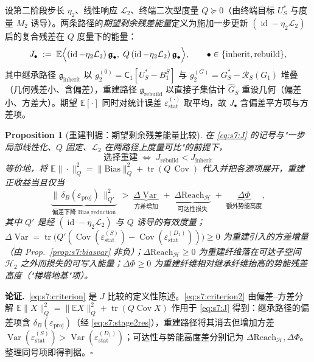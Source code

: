 \documentclass[11pt,a4paper]{article}
\newtheorem{proposition}[theorem]{Proposition}
\DeclareMathOperator{\Cov}{Cov}
\DeclareMathOperator{\Var}{Var}
\DeclareMathOperator{\tr}{tr}
\DeclareMathOperator{\id}{id}
\newcommand{\E}{\mathbb{E}}
\newcommand{\cH}{\mathcal{H}}   %
\newcommand{\cL}{\mathcal{L}}   %
\newcommand{\Rstr}{\mathcal{R}}     %
\newcommand{\Center}{\mathsf{C}}    %
\newcommand{\gres}{\bm{\mathfrak{g}}} %
\begin{document}
设第二阶段步长 $\eta_2$、线性响应 $\cL_2$、终端二次型度量 $Q\succeq 0$（由终端目标 $U_S^*$ 与度量 $M_2$ 诱导）。两条路径的\emph{期望剩余残差能量}定义为施加一步更新 $(\id-\eta_2\cL_2)$ 后的复合残差在 $Q$ 度量下的能量：
\begin{equation}\label{eq:s7:J}
J_\bullet \;:=\; \E\Bigl\langle (\id-\eta_2\cL_2)\,\gres_\bullet,\; Q\,(\id-\eta_2\cL_2)\,\gres_\bullet\Bigr\rangle,\qquad \bullet\in\{\text{inherit},\text{rebuild}\},
\end{equation}
其中继承路径 $\gres_{\text{inherit}}$ 以 $g_2^{(0)}=\Center_1[U_S^*-B_1^S]$ 与 $g_2^{(G)}=G_S^*-\Rstr_S(G_1)$ 堆叠（几何残差小、含偏差），重建路径 $\gres_{\text{rebuild}}$ 以直接子集估计 $\widehat{G}_S$ 重设几何（偏差小、方差大）。期望 $\E[\cdot]$ 同时对统计误差 $\varepsilon_{\mathrm{stat}}^{(\cdot)}$ 取平均，故 $J_\bullet$ 含偏差平方项与方差项。

\begin{proposition}[重建判据：期望剩余残差能量比较]\label{prop:s7:rebuild}
在 \eqref{eq:s7:J} 的记号与"一步局部线性化、$Q$ 固定、$\cL_2$ 在两路径上度量可比"的前提下，
\begin{equation}\label{eq:s7:criterion}
\boxed{\;\text{选择重建}\;\iff\; J_{\text{rebuild}} < J_{\text{inherit}}\;}
\end{equation}
等价地，将 $\E\|\cdot\|_Q^2 = \|\text{Bias}\|_Q^2+\tr(Q\,\Cov)$ 代入并把各源项展开，重建正收益当且仅当
\begin{equation}\label{eq:s7:criterion2}
\underbrace{\bigl\|\,\delta_B(\varepsilon_{\mathrm{proj}})\,\bigr\|_{Q'}^2}_{\textstyle \text{偏差下降 Bias\_reduction}}
\;>\;
\underbrace{\Delta\!\Var}_{\textstyle \text{方差增加}}
\;+\;
\underbrace{\Delta\mathrm{Reach}_{\cH}}_{\textstyle \text{可达性损失}}
\;+\;
\underbrace{\Delta\!\Phi}_{\textstyle \text{额外势能高度}},
\end{equation}
其中 $Q'$ 是经 $(\id-\eta_2\cL_2)$ 与 $Q$ 诱导的有效度量；$\Delta\!\Var = \tr\!\bigl(Q'(\Cov(\varepsilon_{\mathrm{stat}}^{(S)})-\Cov(\varepsilon_{\mathrm{stat}}^{(D_1)}))\bigr)\ge 0$ 为重建引入的方差增量（由 Prop.~\ref{prop:s7:biasvar} 非负）；$\Delta\mathrm{Reach}_{\cH}\ge0$ 为重建纤维落在可达子空间 $\cH_2$ 之外而损失的可写入能量；$\Delta\!\Phi\ge0$ 为重建纤维相对继承纤维抬高的势能残差高度（"楼塔地基"项）。
\end{proposition}

\noindent\textbf{论证.}\ \eqref{eq:s7:criterion} 是 $J$ 比较的定义性陈述。\eqref{eq:s7:criterion2} 由偏差--方差分解 $\E\|X\|_Q^2=\|\E X\|_Q^2+\tr(Q\Cov X)$ 作用于 \eqref{eq:s7:J} 得到：继承路径的偏差项含 $\delta_B(\varepsilon_{\mathrm{proj}})$（经 \eqref{eq:s7:stage2res}），重建路径将其消去但增加方差 $\Var(\varepsilon_{\mathrm{stat}}^{(S)})>\Var(\varepsilon_{\mathrm{stat}}^{(D_1)})$；可达性与势能高度差分别记为 $\Delta\mathrm{Reach}_{\cH},\Delta\!\Phi$。整理同号项即得判据。\hfill$\square$
\end{document}
